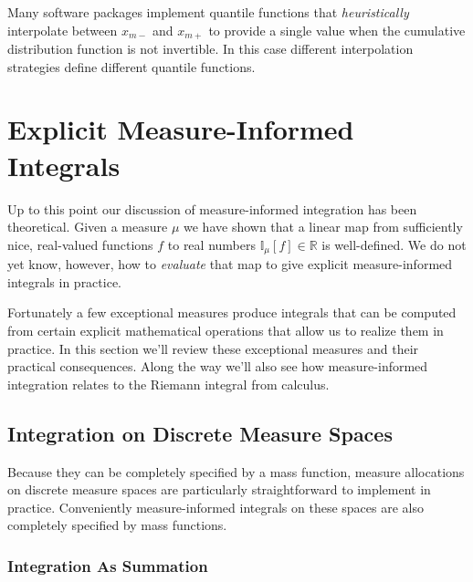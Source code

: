 \documentclass[
  letterpaper,
  DIV=11,
  numbers=noendperiod]{scrartcl}
\begin{document}
Many software packages implement quantile functions that
\emph{heuristically} interpolate between \(x_{m-}\) and \(x_{m+}\) to
provide a single value when the cumulative distribution function is not
invertible. In this case different interpolation strategies define
different quantile functions.

\hypertarget{explicit-measure-informed-integrals}{%
\section{Explicit Measure-Informed
Integrals}\label{explicit-measure-informed-integrals}}

Up to this point our discussion of measure-informed integration has been
theoretical. Given a measure \(\mu\) we have shown that a linear map
from sufficiently nice, real-valued functions \(f\) to real numbers
\(\mathbb{I}_{\mu}[f] \in \mathbb{R}\) is well-defined. We do not yet
know, however, how to \emph{evaluate} that map to give explicit
measure-informed integrals in practice.

Fortunately a few exceptional measures produce integrals that can be
computed from certain explicit mathematical operations that allow us to
realize them in practice. In this section we'll review these exceptional
measures and their practical consequences. Along the way we'll also see
how measure-informed integration relates to the Riemann integral from
calculus.

\hypertarget{integration-on-discrete-measure-spaces}{%
\subsection{Integration on Discrete Measure
Spaces}\label{integration-on-discrete-measure-spaces}}

Because they can be completely specified by a mass function, measure
allocations on discrete measure spaces are particularly straightforward
to implement in practice. Conveniently measure-informed integrals on
these spaces are also completely specified by mass functions.

\hypertarget{integration-as-summation}{%
\subsubsection{Integration As
Summation}\label{integration-as-summation}}
\end{document}
